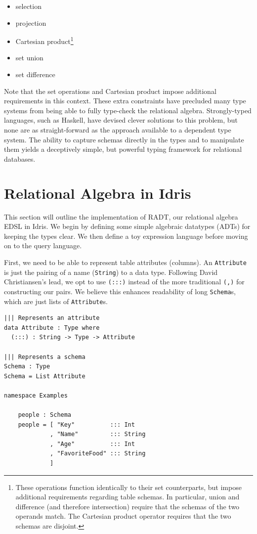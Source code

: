 \documentclass[12pt]{report}
\begin{document}
\begin{itemize}
    \item selection
    \item projection
    \item Cartesian product\footnote{\label{fn:set_ops} These operations function identically to their set counterparts, but impose additional requirements regarding table schemas. In particular, union and difference (and therefore intersection) require that the schemas of the two operands match. The Cartesian product operator requires that the two schemas are disjoint.}
    \item set union\footnotemark[\ref{fn:set_ops}]
    \item set difference\footnotemark[\ref{fn:set_ops}]
\end{itemize}

Note that the set operations and Cartesian product impose additional requirements in this context.
These extra constraints have precluded many type systems from being able to fully type-check the relational algebra.
Strongly-typed languages, such as Haskell, have devised clever solutions to this problem, but none are as straight-forward as the approach available to a dependent type system.
The ability to capture schemas directly in the types and to manipulate them yields a deceptively simple, but powerful typing framework for relational databases.

\section{Relational Algebra in Idris}

This section will outline the implementation of RADT, our relational algebra EDSL in Idris.
We begin by defining some simple algebraic datatypes (ADTs) for keeping the types clear.
We then define a toy expression language before moving on to the query language.

First, we need to be able to represent table attributes (columns).
An \texttt{Attribute} is just the pairing of a name (\texttt{String}) to a data type.
Following David Christiansen's lead, we opt to use \texttt{(:::)} instead of the more traditional \texttt{(,)} for constructing our pairs\cite{ChristiansenTypeProviders}.
We believe this enhances readability of long \texttt{Schema}s, which are just lists of \texttt{Attribute}s.

\begin{lstlisting}[caption={Representing attributes and schemas},label={lst:attrs_and_schemas}]
||| Represents an attribute
data Attribute : Type where
  (:::) : String -> Type -> Attribute

||| Represents a schema
Schema : Type
Schema = List Attribute

namespace Examples

    people : Schema
    people = [ "Key"          ::: Int
             , "Name"         ::: String
             , "Age"          ::: Int
             , "FavoriteFood" ::: String
             ]
\end{lstlisting}
\end{document}
